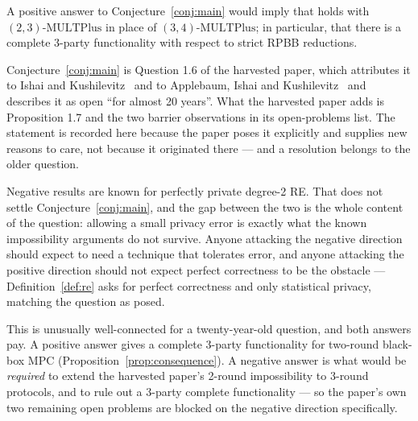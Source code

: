\documentclass{aicr-conjecture}
\newcommand{\MULT}{\mathrm{MULTPlus}}
\begin{document}
\begin{proposition}\label{prop:consequence}
A positive answer to Conjecture~\ref{conj:main} would imply that
{\cite[Theorem 1.5]{ABGIS20}} holds with $(2,3)\text{-}\MULT$ in place of
$(3,4)\text{-}\MULT$; in particular, that there is a complete 3-party
functionality with respect to strict RPBB reductions.
\end{proposition}

\begin{remark}\label{rem:attribution}
Conjecture~\ref{conj:main} is Question 1.6 of the harvested paper, which
attributes it to Ishai and Kushilevitz~\cite{IK00} and to Applebaum,
Ishai and Kushilevitz~\cite{AIK04} and describes it as open ``for almost
20 years''. What the harvested paper adds is Proposition 1.7 and the two
barrier observations in its open-problems list. The statement is recorded
here because the paper poses it explicitly and supplies new reasons to
care, not because it originated there --- and a resolution belongs to the
older question.
\end{remark}

\begin{remark}
Negative results are known for perfectly private degree-2 RE\@. That does
not settle Conjecture~\ref{conj:main}, and the gap between the two is the
whole content of the question: allowing a small privacy error is exactly
what the known impossibility arguments do not survive. Anyone attacking
the negative direction should expect to need a technique that tolerates
error, and anyone attacking the positive direction should not expect
perfect correctness to be the obstacle --- Definition~\ref{def:re} asks for
perfect correctness and only statistical privacy, matching the question as
posed.
\end{remark}

\begin{remark}
This is unusually well-connected for a twenty-year-old question, and both
answers pay. A positive answer gives a complete 3-party functionality for
two-round black-box MPC (Proposition~\ref{prop:consequence}). A negative
answer is what would be \emph{required} to extend the harvested paper's
2-round impossibility to 3-round protocols, and to rule out a 3-party
complete functionality --- so the paper's own two remaining open problems
are blocked on the negative direction specifically.
\end{remark}
\end{document}
